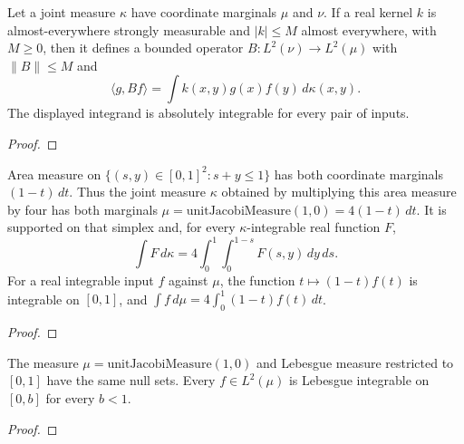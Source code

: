 \begin{supporting}
\begin{theorem}
\label{thm:marginal-kernel-l2}
\leanok
Let a joint measure $\kappa$ have coordinate marginals $\mu$ and $\nu$.
If a real kernel $k$ is almost-everywhere strongly measurable and
$|k|\le M$ almost everywhere, with $M\ge0$, then it defines a bounded
operator $B:L^2(\nu)\to L^2(\mu)$ with $\|B\|\le M$ and
\[
 \langle g,Bf\rangle=\int k(x,y)g(x)f(y)\,d\kappa(x,y).
\]
The displayed integrand is absolutely integrable for every pair of inputs.
\end{theorem}
\begin{proof}
\leanok
\end{proof}

\begin{theorem}
\label{thm:jacobi-volterra-joint}
\leanok
Area measure on $\{(s,y)\in[0,1]^2:s+y\le1\}$ has both coordinate
marginals $(1-t)\,dt$. Thus the joint measure $\kappa$ obtained by multiplying
this area measure by four has both marginals
$\mu=\mathrm{unitJacobiMeasure}(1,0)=4(1-t)\,dt$. It is supported on that
simplex and, for every $\kappa$-integrable real function $F$,
\[
 \int F\,d\kappa=4\int_0^1\int_0^{1-s}F(s,y)\,dy\,ds.
\]
For a real integrable input $f$ against $\mu$, the function
$t\mapsto(1-t)f(t)$ is integrable on $[0,1]$, and
$\int f\,d\mu=4\int_0^1(1-t)f(t)\,dt$.
\end{theorem}
\begin{proof}
\leanok
\end{proof}

\begin{theorem}
\label{thm:jacobi-volterra-local-integrability}
\leanok
The measure $\mu=\mathrm{unitJacobiMeasure}(1,0)$ and Lebesgue measure
restricted to $[0,1]$ have the same null sets. Every $f\in L^2(\mu)$ is
Lebesgue integrable on $[0,b]$ for every $b<1$.
\end{theorem}
\begin{proof}
\leanok
\end{proof}


\end{supporting}
